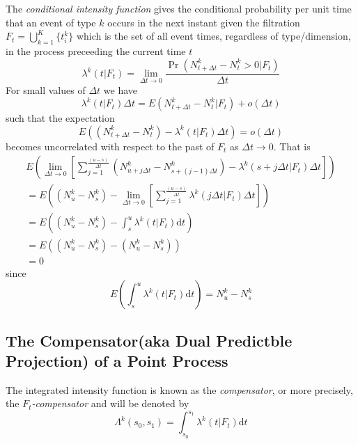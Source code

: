 \documentclass{amsart}
\newcommand{\mathd}{\mathrm{d}}
\newcommand{\tmem}[1]{{\em #1\/}}
\begin{document}
The {\tmem{conditional intensity function}} gives the conditional probability
per unit time that an event of type $k$ occurs in the next instant given the
filtration $F_t = \bigcup_{k = 1}^K \{ t^k_i \}$ which is the set of all event
times, regardless of type/dimension, in the process preceeding the current
time $t$
\begin{equation}
  \lambda^k ( t | F^{}_t) = \lim_{\Delta t \rightarrow 0} \frac{\Pr ( N^k_{t +
  \Delta t} - N^k_t > 0 | F_t)}{\Delta t}
\end{equation}
For small values of $\Delta t$ we have
\begin{equation}
  \lambda^k ( t | F^{}_t) \Delta t = E ( N_{t + \Delta t}^k - N^k_t | F_t) + o
  ( \Delta t)
\end{equation}
such that the expectation
\begin{equation}
  E ( ( N^k_{t + \Delta t} - N^k_t) - \lambda^k ( t | F_t) \Delta t) = o (
  \Delta t)  \label{E}
\end{equation}
becomes uncorrelated with respect to the past of $F_t$ as $\Delta t
\rightarrow 0$. That is
\begin{equation}
  \begin{array}{l}
    E \left( \lim_{\Delta t \rightarrow 0} \left[ \sum_{j = 1}^{\frac{( u -
    s_{})}{\Delta t}} ( N^k_{u + j \Delta t} - N_{s + ( j - 1) \Delta t}^k) -
    \lambda^k ( s + j \Delta t | F_t) \Delta t \right] \right)\\
    = E \left( ( N_u^k - N^k_{s_{}}) - \lim_{\Delta t \rightarrow 0} \left[
    \sum_{j = 1}^{\frac{ ( u - s)}{\Delta t}} \lambda^k ( j \Delta t | F_t)
    \Delta t \right] \right)\\
    = E \left( ( N^k_u - N^k_{s_{}}) - \int_{s_{}}^u \lambda^k ( t | F_t)
    \mathd t \right)\\
    = E ( ( N^k_u - N^k_{s_{}}) - ( N^k_u - N^k_{s_{}}))\\
    = 0
  \end{array}
\end{equation}
since
\begin{equation}
  E \left( \int_s^u \lambda^k ( t | F_t) \mathd t \right) = N^k_u - N^k_s
\end{equation}

\subsection{The Compensator(aka Dual Predictble Projection) of a Point
Process}

The integrated intensity function is known as the {\tmem{compensator}}, or
more precisely, the {\tmem{$F_t$-compensator}} and will be denoted by
\begin{equation}
  \Lambda^k ( s_0, s_1) = \int_{s_0}^{s_1} \lambda^k ( t | F_t) \mathd t
  \label{compensator}
\end{equation}
\end{document}
